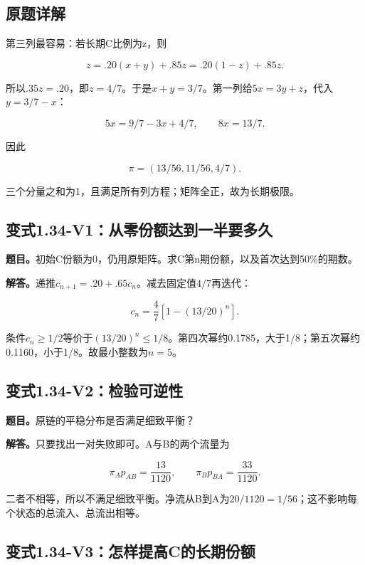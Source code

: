 \documentclass[
  11pt,
  a4paper,
  UTF8,
  fontset=fandol]{ctexart}
\begin{document}
\subsection{原题详解}\label{ux539fux9898ux8be6ux89e3-4}

第三列最容易：若长期C比例为z，则

\[
z=.20(x+y)+.85z=.20(1-z)+.85z.
\]

所以\(.35z=.20\)，即\(z=4/7\)。于是\(x+y=3/7\)。第一列给\(5x=3y+z\)，代入\(y=3/7-x\)：

\[
5x=9/7-3x+4/7,
\qquad8x=13/7.
\]

因此

\[
\boxed{\pi=(13/56,11/56,4/7).}
\]

三个分量之和为1，且满足所有列方程；矩阵全正，故为长期极限。

\subsection{变式1.34-V1：从零份额达到一半要多久}\label{ux53d8ux5f0f1.34-v1ux4eceux96f6ux4efdux989dux8fbeux5230ux4e00ux534aux8981ux591aux4e45}

\textbf{题目。}初始C份额为0，仍用原矩阵。求C第n期份额，以及首次达到50\%的期数。

\textbf{解答。}递推\(c_{n+1}=.20+.65c_n\)。减去固定值\(4/7\)再迭代：

\[
c_n=\frac47\left[1-(13/20)^n\right].
\]

条件\(c_n\ge1/2\)等价于\((13/20)^n\le1/8\)。第四次幂约0.1785，大于1/8；第五次幂约0.1160，小于1/8。故最小整数为\(\boxed{n=5}\)。

\subsection{变式1.34-V2：检验可逆性}\label{ux53d8ux5f0f1.34-v2ux68c0ux9a8cux53efux9006ux6027}

\textbf{题目。}原链的平稳分布是否满足细致平衡？

\textbf{解答。}只要找出一对失败即可。A与B的两个流量为

\[
\pi_Ap_{AB}=\frac{13}{1120},\qquad
\pi_Bp_{BA}=\frac{33}{1120}.
\]

二者不相等，所以不满足细致平衡。净流从B到A为\(20/1120=1/56\)；这不影响每个状态的总流入、总流出相等。

\subsection{变式1.34-V3：怎样提高C的长期份额}\label{ux53d8ux5f0f1.34-v3ux600eux6837ux63d0ux9ad8cux7684ux957fux671fux4efdux989d}
\end{document}
